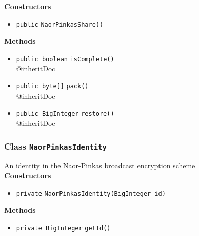 \textbf{Constructors}
\begin{itemize}
\item \lstinline|public| \lstinline|NaorPinkasShare|\lstinline|()|




\end{itemize}


\textbf{Methods}
\begin{itemize}
\item \lstinline|public boolean| \lstinline|isComplete|\lstinline|()|\\
{@inheritDoc}



\item \lstinline|public byte[]| \lstinline|pack|\lstinline|()|\\
{@inheritDoc}



\item \lstinline|public BigInteger| \lstinline|restore|\lstinline|()|\\
{@inheritDoc}



\end{itemize}

\subsubsection{Class \lstinline|NaorPinkasIdentity|}
An identity in the Naor-Pinkas broadcast encryption scheme \\




\textbf{Constructors}
\begin{itemize}
\item \lstinline|private| \lstinline|NaorPinkasIdentity|\lstinline|(BigInteger id)|




\end{itemize}


\textbf{Methods}
\begin{itemize}
\item \lstinline|private BigInteger| \lstinline|getId|\lstinline|()|




\end{itemize}


